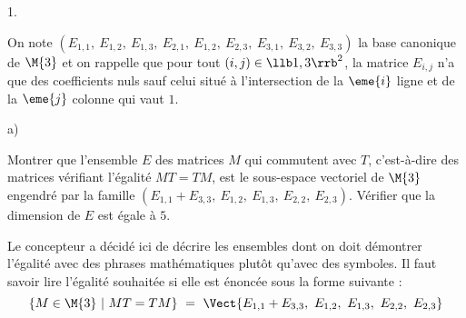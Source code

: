 \documentclass[11pt]{article}%
\begin{document}
\begin{noliste}{1.}
\newpage


\item On note $(E_{1, 1}, \ E_{1, 2}, \ E_{1, 3}, \ E_{2, 1}, \ E_{1,
    2}, \ E_{2, 3}, \ E_{3, 1}, \ E_{3, 2}, \ E_{3, 3})$ la base
  canonique de $\M{3}$ et on rappelle que pour tout $(i, j) \in \llb
  1, 3 \rrb^2$, la matrice $E_{i, j}$ n'a que des coefficients nuls
  sauf celui situé à l'intersection de la $\eme{i}$ ligne et de la
  $\eme{j}$ colonne qui vaut $1$.
  \begin{noliste}{a)}
    \setlength{\itemsep}{2mm}
  \item Montrer que l'ensemble $E$ des matrices $M$ qui commutent avec
    $T$, c'est-à-dire des matrices vérifiant l'égalité $MT = TM$, est
    le sous-espace vectoriel de $\M{3}$ engendré par la famille
    $(E_{1, 1} + E_{3, 3}, \ E_{1, 2}, \ E_{1,3}, \ E_{2, 2}, \ E_{2,
      3})$. Vérifier que la dimension de $E$ est égale à $5$.
    \begin{remarkL}{.98}
      Le concepteur a décidé ici de décrire les ensembles dont on doit
      démontrer l'égalité avec des phrases mathématiques plutôt
      qu'avec des symboles. Il faut savoir lire l'égalité souhaitée si
      elle est énoncée sous la forme suivante :
      \[
      \{ M \in \M{3} \ | \ MT = TM \} \ = \ \Vect{ E_{1, 1} + E_{3,
          3}, \ E_{1, 2}, \ E_{1,3}, \ E_{2, 2}, \ E_{2, 3} }
      \]
    \end{remarkL}


\end{noliste}
\end{noliste}
\end{document}
